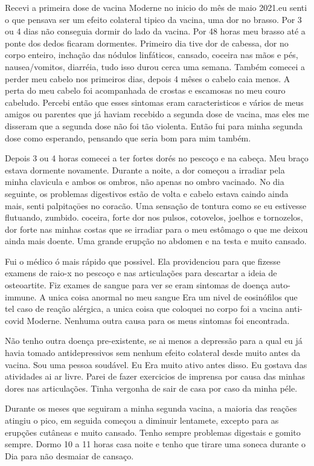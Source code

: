 Recevi a primeira dose de vacina Moderne no inicio do mês de maio 2021.eu senti
o que pensava ser um efeito colateral tipico da vacina, uma dor no brasso. Por 3
ou 4 dias não conseguia dormir do lado da vacina. Por 48 horas meu brasso até a
ponte dos dedos ficaram dormentes. Primeiro dia tive dor de cabessa, dor no
corpo enteiro, inchação das nódulos linfáticos, cansado, coceira nas mãos e pés,
nausea/vomitos, diarréia, tudo isso durou cerca uma semana. Também comecei a
perder meu cabelo nos primeiros dias, depois 4 mêses o cabelo caia menos. A
perta do meu cabelo foi acompanhada de crostas e escamosas no meu couro
cabeludo. Percebi então que esses sintomas eram caracteristicos e vários de meus
amigos ou parentes que já haviam recebido a segunda dose de vacina, mas eles me
disseram que a segunda dose não foi tão violenta. Então fui para minha segunda
dose como esperando, pensando que seria bom para mim também.

Depois 3 ou 4 horas comecei a ter fortes dorés no pescoço e na cabeça. Meu braço
estava dormente novamente. Durante a noite, a dor começou a irradiar pela minha
clavicula e ambos os ombros, não apenas no ombro vacinado. No dia seguinte, os
problemas digestivos estão de volta e cabelo estava caindo ainda mais, senti
palpitaçōes no coracão. Uma sensação de tontura como se eu estivesse flutuando,
zumbido. coceira, forte dor nos pulsos, cotovelos, joelhos e tornozelos, dor
forte nas minhas costas que se irradiar para o meu estômago o que me deixou
ainda mais doente. Uma grande erupção no abdomen e na testa e muito cansado.

Fui o médico ó mais rápido que possivel. Ela providenciou para que fizesse
examens de raio-x no pescoço e nas articulações para descartar a ideia de
osteoartite. Fiz exames de sangue para ver se eram sintomas de doença
auto-immune. A unica coisa anormal no meu sangue Era um nivel de eosinófilos que
tel caso de reação alérgica, a unica coisa que coloquei no corpo foi a vacina
anti-covid Moderne. Nenhuma outra causa para os meus sintomas foi encontrada.

Não tenho outra doença pre-existente, se ai menos a depressão para a qual eu já
havia tomado antidepressivos sem nenhum efeito colateral desde muito antes da
vacina. Sou uma pessoa soudável. Eu Era muito ativo antes disso. Eu gostava das
atividades ai ar livre. Parei de fazer exercicios de imprensa por causa das
minhas dores nas articulações. Tinha vergonha de sair de casa por caso da minha
péle.

Durante os meses que seguiram a minha segunda vacina, a maioria das reações
atingiu o pico, em seguida começou a diminuir lentamete, excepto para as
erupções cutâneas e muito cansado. Tenho sempre problemas digestais e gomito
sempre. Dormo 10 a 11 horas casa noite e tenho que tirare uma soneca durante o
Dia para não desmaiar de cansaço.

